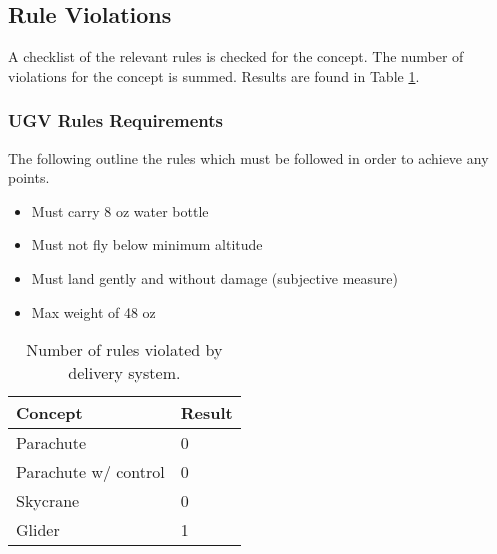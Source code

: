 \documentclass[]{auvsi_doc}
\begin{document}
	\subsection{Rule Violations}


	A checklist of the relevant rules is checked for the concept. The number of violations for the concept is summed. Results are found in Table \ref{rules}.

\subsubsection{UGV Rules Requirements}
The following outline the rules which must be followed in order to achieve any points. 
\begin{itemize}
\item Must carry 8 oz water bottle
\item Must not fly below minimum altitude
\item Must land gently and without damage (subjective measure)
\item Max weight of 48 oz
\end{itemize}


	\begin{table}[!h]
	\centering

	\caption{Number of rules violated by delivery system.}
	\label{rules}
	\begin{tabular}{|l|l|}
		\hline
		\textbf{Concept}       & \textbf{Result} \\
		\hline
		Parachute              &       0          \\
		Parachute w/ control   &       0         \\
		Skycrane               &            0     \\
		Glider                 &		1		 \\
		\hline
	\end{tabular}
	\end{table}
\end{document}
